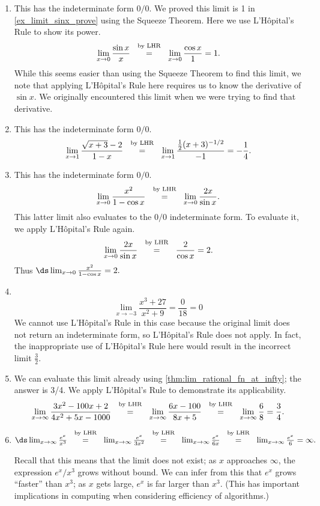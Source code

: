 {\begin{enumerate}
	\item	This has the indeterminate form $0/0$. We proved this limit is 1 in \autoref{ex_limit_sinx_prove} using the Squeeze Theorem. Here we use L'H\^opital's Rule to show its power.
$$\lim_{x\to0}\frac{\sin x}x \stackrel{\ \text{ by LHR \rule[-5pt]{0pt}{3pt}} \ }{=} \lim_{x\to0} \frac{\cos x}{1}=1.$$
While this seems easier than using the Squeeze Theorem to find this limit, we note that applying L'H\^opital's Rule here requires us to know the derivative of $\sin x$. We originally encountered this limit when we were trying to find that derivative.

	\item	This has the indeterminate form $0/0$.
\[\lim_{x\to 1}\frac{\sqrt{x+3}-2}{1-x} 	 \stackrel{\ \text{ by LHR \rule[-5pt]{0pt}{3pt}} \ }{=} \lim_{x \to 1} \frac{\frac12(x+3)^{-1/2}}{-1} =-\frac 14.\]

	\item	This has the indeterminate form $0/0$.
\[\lim_{x\to 0}\frac{x^2}{1-\cos x}  \stackrel{\ \text{ by LHR \rule[-5pt]{0pt}{3pt}} \ }{=}  \lim_{x\to 0} \frac{2x}{\sin x}.\]
This latter limit also evaluates to the $0/0$ indeterminate form. To evaluate it, we apply L'H\^opital's Rule again.
\[
 \lim_{x\to 0} \frac{2x}{\sin x}
 \stackrel{\ \text{ by LHR \rule[-5pt]{0pt}{3pt}} \ }{=} \frac{2}{\cos x} = 2 .
\]
Thus $\ds \lim_{x\to0}\frac{x^2}{1-\cos x}=2.$

	\item \mbox{}\\[-2\baselineskip]
\[\lim_{x\to-3}\frac{x^3+27}{x^2+9} =\frac 0{18}=0\]
We cannot use L'H\^opital's Rule in this case because the original limit does not return an indeterminate form, so L'H\^opital's Rule does not apply. In fact, the inappropriate use of L'H\^opital's Rule here would result in the incorrect limit $\frac32$.

	\item	We can evaluate this limit already using \autoref{thm:lim_rational_fn_at_infty}; the answer is 3/4. We apply L'H\^opital's Rule to demonstrate its applicability.
$$\lim_{x\to\infty} \frac{3x^2-100x+2}{4x^2+5x-1000}\stackrel{\ \text{ by LHR \rule[-5pt]{0pt}{3pt}} \ }{=} \lim_{x\to\infty} \frac{6x-100}{8x+5} \stackrel{\ \text{ by LHR \rule[-5pt]{0pt}{3pt}} \ }{=} \lim_{x\to\infty} \frac68 = \frac34.$$

	\item	$\ds\lim_{x\to \infty}\frac{e^x}{x^3} \stackrel{\ \text{ by LHR \rule[-5pt]{0pt}{3pt}} \ }{=} \lim_{x\to\infty} \frac{e^x}{3x^2} \stackrel{\ \text{ by LHR \rule[-5pt]{0pt}{3pt}} \ }{=} \lim_{x\to\infty} \frac{e^x}{6x} \stackrel{\ \text{ by LHR \rule[-5pt]{0pt}{3pt}} \ }{=} \lim_{x\to\infty} \frac{e^x}{6} = \infty.$

Recall that this means that the limit does not exist; as $x$ approaches $\infty$, the expression $e^x/x^3$ grows without bound. We can infer from this that $e^x$ grows ``faster'' than $x^3$; as $x$ gets large, $e^x$ is far larger than $x^3$. (This has important implications in computing when considering efficiency of algorithms.)\eoehere
\end{enumerate}}

